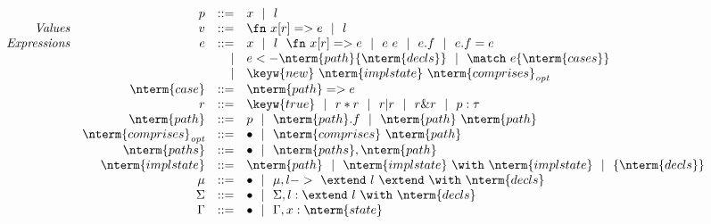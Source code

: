 \[
\begin{array}{c}
\begin{array}{rrrll}
 & p & ::= & x~~|~~l\\
\emph{Values} & v & ::= & \fn\ x [r] => e~~|~~l \\
\emph{Expressions} & e & ::= & x~~|~~l~~\fn\ x [r] => e
                   ~~|~~e\ e~~|~~e.f~~|~~e.f = e\\
                   &   & |   & e <- \nterm{path} \{ \nterm{decls} \}
                   ~~|~~\match\ e \{ \nterm{cases} \}\\
                   &   & |   & \keyw{new}\ \nterm{implstate}\ 
                                           \nterm{comprises}_\emph{opt}\\
 & \nterm{case} & ::= & \nterm{path} => e \\
 & r            & ::= & \keyw{true}~~|~~r*r~~|~~r|r~~|~~r\&r~~|~~p:\tau\\
 & \nterm{path} & ::= & p~~|~~\nterm{path}.f~~|~~\nterm{path}\ \nterm{path}\\
 & \nterm{comprises}_\emph{opt} & ::= &\bullet~~|~~\nterm{comprises}\ 
                                                   \nterm{path}\\
 & \nterm{paths} & ::= & \bullet~~|~~\nterm{paths}, \nterm{path}\\
 & \nterm{implstate} & ::= & \nterm{path}
                   ~~|~~\nterm{implstate}\ \with\ \nterm{implstate}
                   ~~|~~\{ \nterm{decls} \} \\
 & \mu & ::= & \bullet
               ~~|~~\mu, l ->\ \extend\ l\ \extend\ \with\ \nterm{decls}\\
 & \Sigma & ::= & \bullet~~|~~\Sigma, l:\extend\ l\ \with\ \nterm{decls}\\
 & \Gamma & ::= & \bullet~~|~~\Gamma, x:\nterm{state}
\end{array}
\end{array}
\]

%
%
%
%
%
%
%
%
%
%
%
%
%

